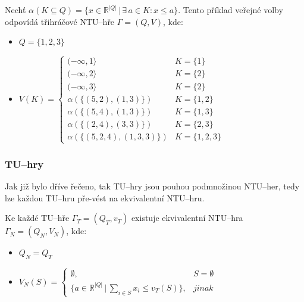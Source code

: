             Nechť $\alpha(K \subseteq Q) = \{x \in \mathbb{R}^{|Q|}\,|\, \exists\, a \in K:  x \leqslant a\}$. Tento příklad veřejné volby odpovídá třihráčové NTU--hře $\Gamma = (Q, V)$, kde:
            \begin{itemize}
                \vspace*{-0.3em}
                \item $Q = \{1,2,3\}$
                \item $V(K) = \begin{cases}
                    (-\infty, 1\rangle & K = \{1\}\\
                    (-\infty, 2\rangle & K = \{2\}\\
                    (-\infty, 3\rangle & K = \{2\}\\
                    \alpha(\{(5, 2), (1, 3)\}) & K = \{1,2\}\\
                    \alpha(\{(5, 4), (1, 3)\}) & K = \{1,3\}\\
                    \alpha(\{(2, 4), (3, 3)\}) & K = \{2, 3\}\\
                    \alpha(\{(5, 2, 4), (1, 3, 3)\}) & K = \{1,2,3\}
                \end{cases}$
            \end{itemize}

        \subsubsection*{TU--hry}
            Jak již bylo dříve řečeno, tak TU--hry jsou pouhou podmnožinou NTU--her, tedy lze každou TU--hru pře-vést na ekvivalentní NTU--hru.

            Ke každé TU--hře $\Gamma_T = (Q_T, v_T)$ existuje ekvivalentní NTU--hra $\Gamma_N = (Q_N, V_N)$, kde:

            \vspace*{-0.3em}
            \begin{itemize}
                \item $Q_N = Q_T$
                \item $V_N(S) = \begin{cases}
                            \emptyset, & S = \emptyset\\
                            \{a \in \mathbb{R}^{|Q|}\,|\, \sum_{i\in S} x_i \leq v_T(S)\}, &jinak
                        \end{cases}
                        $
            \end{itemize}

